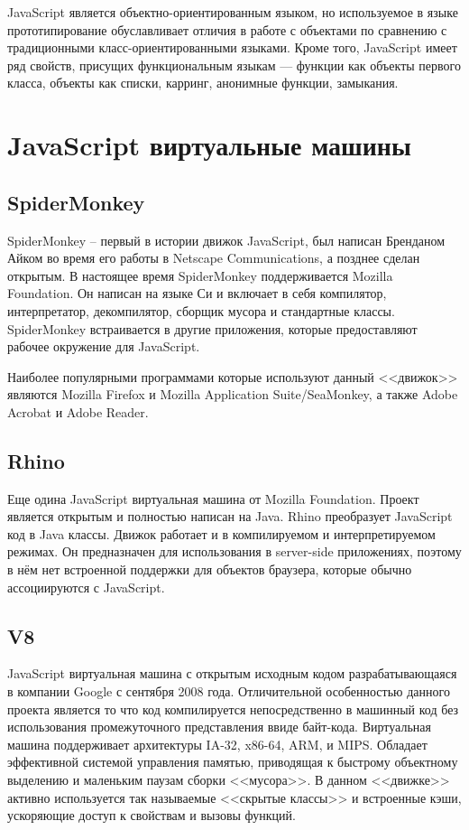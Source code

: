 JavaScript является объектно-ориентированным языком, но используемое в языке прототипирование обуславливает отличия в работе с объектами по сравнению с традиционными класс-ориентированными языками. Кроме того, JavaScript имеет ряд свойств, присущих функциональным языкам — функции как объекты первого класса, объекты как списки, карринг, анонимные функции, замыкания.
\cite{wiki:JS:ru}

\section{JavaScript виртуальные машины}
 
\subsection{SpiderMonkey}

SpiderMonkey -- первый в истории движок JavaScript, был написан Бренданом Айком во время его работы в Netscape Communications, а позднее сделан открытым. В настоящее время SpiderMonkey поддерживается Mozilla Foundation. Он написан на языке Си и включает в себя компилятор, интерпретатор, декомпилятор, сборщик мусора и стандартные классы. SpiderMonkey встраивается в другие приложения, которые предоставляют рабочее окружение для JavaScript.

Наиболее популярными программами которые используют данный <<движок>> являются Mozilla Firefox и Mozilla Application Suite/SeaMonkey, а также Adobe Acrobat и Adobe Reader.
\cite{wiki:SpiderMonkey:ru}

\subsection{Rhino}

Еще одина JavaScript виртуальная машина от Mozilla Foundation. Проект является открытым и полностью написан на Java. Rhino преобразует JavaScript код в Java классы. Движок работает и в компилируемом и интерпретируемом режимах. Он предназначен для использования в server-side приложениях, поэтому в нём нет встроенной поддержки для объектов браузера, которые обычно ассоциируются с JavaScript.
\cite{wiki:Rhino:ru}

\subsection{V8}
JavaScript виртуальная машина с открытым исходным кодом разрабатывающаяся в компании Google с сентября 2008 года. Отличительной особенностью данного проекта является то что код компилируется непосредственно в машинный код без использования промежуточного представления ввиде байт-кода. Виртуальная машина поддерживает архитектуры IA-32, x86-64, ARM, и MIPS. Обладает эффективной системой управления памятью, приводящая к быстрому объектному выделению и маленьким паузам сборки <<мусора>>. В данном <<движке>> активно используется так называемые <<скрытые классы>> и встроенные кэши, ускоряющие доступ к свойствам и вызовы функций.

